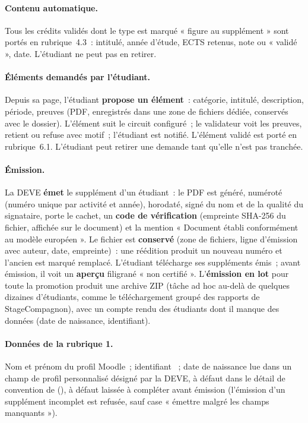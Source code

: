 \documentclass[11pt,a4paper]{article}
\newcommand{\code}[1]{\texttt{\detokenize{#1}}}
\begin{document}
\paragraph{Contenu automatique.} Tous les crédits validés dont le type est marqué « figure
au supplément » sont portés en rubrique~4.3~: intitulé, année d'étude, ECTS retenus, note
ou « validé », date. L'étudiant ne peut pas en retirer.

\paragraph{Éléments demandés par l'étudiant.} Depuis sa page, l'étudiant \textbf{propose
un élément}~: catégorie, intitulé, description, période, preuves (PDF, enregistrés dans une
zone de fichiers dédiée, conservés avec le dossier). L'élément suit le circuit configuré~;
le validateur voit les preuves, retient ou refuse avec motif~; l'étudiant est notifié.
L'élément validé est porté en rubrique~6.1. L'étudiant peut retirer une demande tant
qu'elle n'est pas tranchée.

\paragraph{Émission.} La DEVE \textbf{émet} le supplément d'un étudiant~: le PDF est
généré, numéroté (numéro unique par activité et année), horodaté, signé du nom et de la
qualité du signataire, porte le cachet, un \textbf{code de vérification} (empreinte
SHA-256 du fichier, affichée sur le document) et la mention « Document établi
conformément au modèle européen ». Le fichier est \textbf{conservé} (zone de fichiers,
ligne d'émission avec auteur, date, empreinte)~: une réédition produit un nouveau numéro et
l'ancien est marqué remplacé. L'étudiant télécharge ses suppléments émis~; avant émission,
il voit un \textbf{aperçu} filigrané « non certifié ». L'\textbf{émission en lot} pour
toute la promotion produit une archive ZIP (tâche ad hoc au-delà de quelques dizaines
d'étudiants, comme le téléchargement groupé des rapports de StageCompagnon), avec un
compte rendu des étudiants dont il manque des données (date de naissance, identifiant).

\paragraph{Données de la rubrique 1.} Nom et prénom du profil Moodle~; identifiant
\code{idnumber}~; date de naissance lue dans un champ de profil personnalisé désigné par la
DEVE, à défaut dans le détail de convention de \code{mod_stage} (\code{birthdate}), à
défaut laissée à compléter avant émission (l'émission d'un supplément incomplet est
refusée, sauf case « émettre malgré les champs manquants »).
\end{document}
